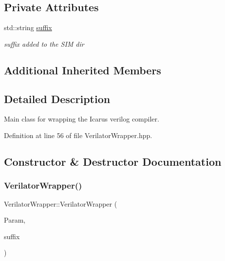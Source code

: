 \subsection*{Private Attributes}
\begin{DoxyCompactItemize}
\item 
std\+::string \hyperlink{classVerilatorWrapper_af3697ee97f7a93c117e04695a0aa6e70}{suffix}
\begin{DoxyCompactList}\small\item\em suffix added to the S\+IM dir \end{DoxyCompactList}\end{DoxyCompactItemize}
\subsection*{Additional Inherited Members}


\subsection{Detailed Description}
Main class for wrapping the Icarus verilog compiler. 

Definition at line 56 of file Verilator\+Wrapper.\+hpp.



\subsection{Constructor \& Destructor Documentation}
\mbox{\label{classVerilatorWrapper_ac1530972022e23dda9782f17a512b310}} 
\subsubsection{\texorpdfstring{Verilator\+Wrapper()}{VerilatorWrapper()}}
{\footnotesize\ttfamily Verilator\+Wrapper\+::\+Verilator\+Wrapper (\begin{DoxyParamCaption}\item[{const \hyperlink{Parameter_8hpp_a37841774a6fcb479b597fdf8955eb4ea}{Parameter\+Const\+Ref} \&}]{Param,  }\item[{std\+::string}]{suffix }\end{DoxyParamCaption})}



